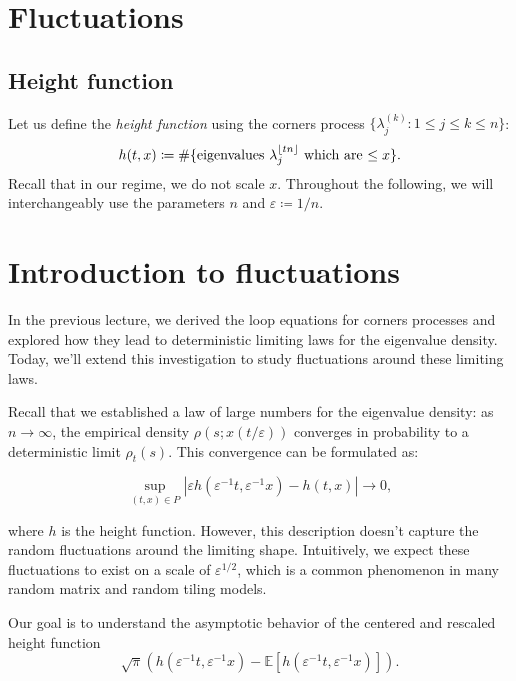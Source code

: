 \documentclass[letterpaper,11pt,oneside,reqno]{article}
\numberwithin{equation}{section}
\theoremstyle{definition}
\begin{document}
\section{Fluctuations}

\subsection{Height function}

Let us define the \emph{height function} using the corners process
$\{ \lambda^{(k)}_j\colon 1\le j\le k\le n \}$:
\begin{equation*}
	h(t,x)\coloneqq \#
	\{ \textnormal{eigenvalues $\lambda^{\lfloor tn \rfloor }_j$ which 
	are $\leq x$} \}.
\end{equation*}
Recall that in our regime, we do not scale $x$.
Throughout the following, we will interchangeably use
the parameters $n$ and
$\varepsilon\coloneqq 1/n$.











\newpage
\section{Introduction to fluctuations}

In the previous lecture, we derived the loop equations for corners processes and explored how they lead to deterministic limiting laws for the eigenvalue density. Today, we'll extend this investigation to study fluctuations around these limiting laws.

Recall that we established a law of large numbers for the eigenvalue density: as $n \to \infty$, the empirical density $\rho(s; x(t/\varepsilon))$ converges in probability to a deterministic limit $\rho_t(s)$. This convergence can be formulated as:

$$\sup_{(t,x) \in P} |\varepsilon h(\varepsilon^{-1}t, \varepsilon^{-1}x) - h(t,x)| \to 0,$$

where $h$ is the height function. However, this description doesn't capture the random fluctuations around the limiting shape. Intuitively, we expect these fluctuations to exist on a scale of $\varepsilon^{1/2}$, which is a common phenomenon in many random matrix and random tiling models.

Our goal is to understand the asymptotic behavior of the centered and rescaled height function
$$\sqrt{\pi}(h(\varepsilon^{-1}t, \varepsilon^{-1}x) - \mathbb{E}[h(\varepsilon^{-1}t, \varepsilon^{-1}x)]).$$
\end{document}
